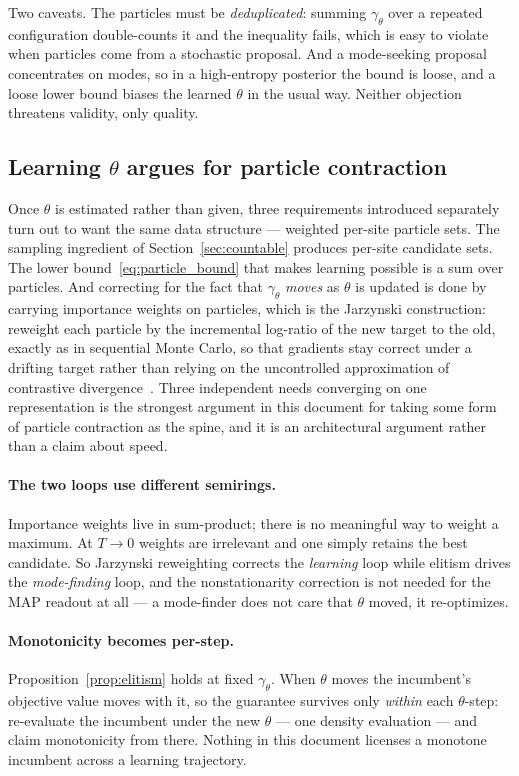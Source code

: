 Two caveats. The particles must be \emph{deduplicated}: summing $\gamma_\theta$ over a repeated configuration double-counts it and the inequality fails, which is easy to violate when particles come from a stochastic proposal. And a mode-seeking proposal concentrates on modes, so in a high-entropy posterior the bound is loose, and a loose lower bound biases the learned $\theta$ in the usual way. Neither objection threatens validity, only quality.

\subsection{Learning \texorpdfstring{$\theta$}{theta} argues for particle contraction}
\label{sec:learning}

Once $\theta$ is estimated rather than given, three requirements introduced separately turn out to want the same data structure --- weighted per-site particle sets. The sampling ingredient of Section~\ref{sec:countable} produces per-site candidate sets. The lower bound~\eqref{eq:particle_bound} that makes learning possible is a sum over particles. And correcting for the fact that $\gamma_\theta$ \emph{moves} as $\theta$ is updated is done by carrying importance weights on particles, which is the Jarzynski construction: reweight each particle by the incremental log-ratio of the new target to the old, exactly as in sequential Monte Carlo, so that gradients stay correct under a drifting target rather than relying on the uncontrolled approximation of contrastive divergence~\citep{Carbone2023}. Three independent needs converging on one representation is the strongest argument in this document for taking some form of particle contraction as the spine, and it is an architectural argument rather than a claim about speed.

\paragraph{The two loops use different semirings.} Importance weights live in sum-product; there is no meaningful way to weight a maximum. At $T \rightarrow 0$ weights are irrelevant and one simply retains the best candidate. So Jarzynski reweighting corrects the \emph{learning} loop while elitism drives the \emph{mode-finding} loop, and the nonstationarity correction is not needed for the MAP readout at all --- a mode-finder does not care that $\theta$ moved, it re-optimizes.

\paragraph{Monotonicity becomes per-step.} Proposition~\ref{prop:elitism} holds at fixed $\gamma_\theta$. When $\theta$ moves the incumbent's objective value moves with it, so the guarantee survives only \emph{within} each $\theta$-step: re-evaluate the incumbent under the new $\theta$ --- one density evaluation --- and claim monotonicity from there. Nothing in this document licenses a monotone incumbent across a learning trajectory.

